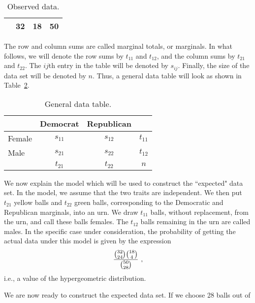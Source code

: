 \begin{example}
\begin{table}
\begin{tabular}{|l|c|c|c|}
       & 32                  & 18               & \hspace{.2in} 50  \\ \hline
\end{tabular}
\caption{Observed data.}
\label{table 5.2}
\end{table}
The row and column sums are called marginal totals, or marginals.  In
what follows, we will denote the row sums by $t_{11}$ and $t_{12}$, and the column
sums by $t_{21}$ and $t_{22}$.  The
$ij$th entry in the table will be denoted by $s_{ij}$.  Finally, the size of the data
set will be denoted by $n$.  Thus, a general data table will look as shown in Table~\ref{table 5.3}.
\begin{table}
\centering
\begin{tabular}{|l|c|c|c|}
\hline
 & \hspace{.15in}Democrat\hspace{.15in} & \hspace{.1in}Republican\hspace{.1in} & \\ \hline 
\hspace{.1in}Female & $s_{11}$ & $s_{12}$ & \hspace{.2in}$t_{11}$\hspace{.2in}\\ \hline
\hspace{.1in}Male   & $s_{21}$ & $s_{22}$ & \hspace{.2in}$t_{12}$\\ \hline
                    & $t_{21}$ & $t_{22}$ & \hspace{.2in}$n$\\ \hline
\end{tabular}
\caption{General data table.}
\label{table 5.3}
\end{table}
We now explain the model which will be used to construct the ``expected" data set. 
In the model, we assume that the two traits are independent.  We then put $t_{21}$
yellow balls and $t_{22}$ green balls, corresponding to the Democratic and Republican
marginals, into an urn.  We draw $t_{11}$ balls, without replacement, from the urn,
and call these balls females.  The $t_{12}$ balls remaining in the urn are called
males.  In the specific case under consideration, the probability of getting the actual
data under this model is given by the expression
$${{{{32}\choose{24}}{{18}\choose{4}}}\over{{{50}\choose{28}}}}\ ,$$
i.e., a value of the hypergeometric distribution.
\par
We are now ready to construct the expected data set.  If we choose 28 balls out of

\end{example}
